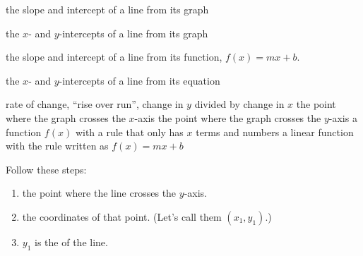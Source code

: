 \documentclass[fleqn,letterpaper,12pt,printwatermark=false]{memoir}
\begin{document}
 

\newcommand{\myClassName}{Pre-AP Algebra 2}
\newcommand{\myUnitNumber}{1}
\newcommand{\myUnitTitle}{Introduction to Functions}
\newcommand{\myLessonNumber}{6}
\newcommand{\myLessonTitle}{Attributes of Linear Functions}



\pagestyle{myPagestyle}

\checkandfixthelayout
{}

\begin{myNotesHeader}
    \item {} the slope and intercept of a line from its graph
    \item {} the $x$- and $y$-intercepts of a line from its graph
    \item {} the slope and intercept of a line from its function, $f(x) = mx+b$.
    \item {} the $x$- and $y$-intercepts of a line from its equation
\end{myNotesHeader}

\begin{myVocabulary}
    {
        rate of change, ``rise over run'', change in $y$ divided by change in $x$
    }
    {
        the point where the graph crosses the $x$-axis
    }
    {
        the point where the graph crosses the $y$-axis
    }
    {
        a function $f(x)$ with a rule that only has $x$ terms and numbers
    }
    {
        a linear function with the rule written as $f(x) = mx+b$
    }
\end{myVocabulary}

\begin{myKeyConcepts}
    Follow these steps:
    \begin{enumerate}
        \item {}the point where the line crosses the $y$-axis. 
        \item {}the coordinates of that point. (Let's call them $(x_1,y_1)$.)
        \item $y_1$ is the of the line.
    \end{enumerate}
\end{myKeyConcepts}
\end{document}
